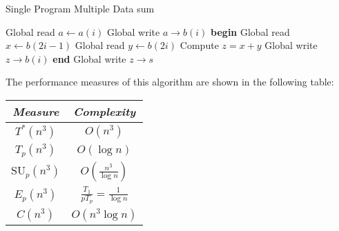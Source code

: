 \begin{example}
    \begin{algorithm}[H]
        \caption{Single Program Multiple Data sum}
        \begin{algorithmic}[1]
            \State Global read $a \leftarrow a(i)$
            \State Global write $a \rightarrow b(i)$
                    \State \textbf{begin}
                    \State Global read $x \leftarrow b(2i-1)$
                    \State Global read $y \leftarrow b(2i)$
                    \State Compute $z = x + y$
                    \State Global write $z \rightarrow b(i)$
                    \State \textbf{end}
                \EndIf
            \EndFor
                \State Global write $z \rightarrow s$
            \EndIf
        \end{algorithmic}
    \end{algorithm}
    
    The performance measures of this algorithm are shown in the following table:
    \renewcommand*{\arraystretch}{2}
    \begin{table}[H]
        \centering
        \begin{tabular}{|c|c|}
        \hline
        \textit{Measure} & \textit{Complexity} \\ \hline
        $T^\ast(n^3)$ & $O(n^3)$ \\ \hline
        $T_p(n^3)$ & $O\left(\log n\right)$ \\ \hline
        $\text{SU}_p(n^3)$ & $O\left(\frac{n^3}{\log n}\right)$ \\ \hline
        $E_p(n^3)$ & $\frac{T_1}{p T_p} = \frac{1}{\log n}$ \\ \hline
        $C(n^3)$ & $O\left(n^3\log n\right)$ \\ \hline
        \end{tabular}
    \end{table}
    \renewcommand*{\arraystretch}{1}
\end{example}